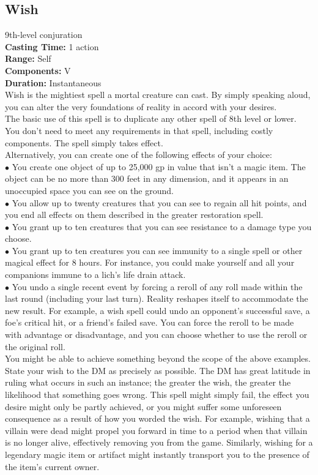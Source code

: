 \documentclass[11pt, A4paper, english]{article}
\begin{document}
		\subsection{Wish}
9th-level conjuration \\
\textbf{Casting Time:} 1 action \\
\textbf{Range:} Self \\
\textbf{Components:} V \\
\textbf{Duration:} Instantaneous \\
Wish is the mightiest spell a mortal creature can cast. By simply speaking aloud, you can alter the very foundations of reality in accord with your desires. \\
The basic use of this spell is to duplicate any other spell of 8th level or lower. You don’t need to meet any requirements in that spell, including costly components. The spell simply takes effect. \\
Alternatively, you can create one of the following effects of your choice: \\
$\bullet$ You create one object of up to 25,000 gp in value that isn’t a magic item. The object can be no more than 300 feet in any dimension, and it appears in an unoccupied space you can see on the ground. \\
$\bullet$ You allow up to twenty creatures that you can see to regain all hit points, and you end all effects on them described in the greater restoration spell. \\
$\bullet$ You grant up to ten creatures that you can see resistance to a damage type you choose. \\
$\bullet$ You grant up to ten creatures you can see immunity to a single spell or other magical effect for 8 hours. For instance, you could make yourself and all your companions immune to a lich’s life drain attack. \\
$\bullet$ You undo a single recent event by forcing a reroll of any roll made within the last round (including your last turn). Reality reshapes itself to accommodate the new result. For example, a wish spell could undo an opponent’s successful save, a foe’s critical hit, or a friend’s failed save. You can force the reroll to be made with advantage or disadvantage, and you can choose whether to use the reroll or the original roll. \\
You might be able to achieve something beyond the scope of the above examples. State your wish to the DM as precisely as possible. The DM has great latitude in ruling what occurs in such an instance; the greater the wish, the greater the likelihood that something goes wrong. This spell might simply fail, the effect you desire might only be partly achieved, or you might suffer some unforeseen consequence as a result of how you worded the wish. For example, wishing that a villain were dead might propel you forward in time to a period when that villain is no longer alive, effectively removing you from the game. Similarly, wishing for a legendary magic item or artifact might instantly transport you to the presence of the item’s current owner. \\
\end{document}
